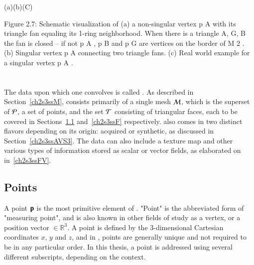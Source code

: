(a)(b)(C)

Figure 2.7: Schematic visualization of (a) a non-singular vertex p A with its triangle fan equaling its 1-ring neighborhood. When there is a triangle {A, G, B} the fan is closed – if not p A , p B and p G are vertices on the border of M 2 . (b) Singular vertex p A connecting two triangle fans. (c) Real world example for a singular vertex p A .~\cite[p.~29]{Mara12}
%
%
%
%
%
\section{\tdd}
\label{ch2s3}
The data upon which one convolves  is called \tdd{}. As described in Section~\ref{ch2s3ssM}, \tdd{} consists primarily of a single mesh $\mathcal{M}$, which is the superset of $\mathcal{P}$, a set of points, and the set $\mathcal{T}$ consisting of triangular faces, each to be covered in Sections~\ref{ch2s3ssP} and~\ref{ch2s3ssF} respectively. \tdd{} also comes in two distinct flavors depending on its origin: acquired or synthetic, as discussed in Section~\ref{ch2s3ssAVS3}. The data can also include a texture map and other various types of information stored as scalar or vector fields, as elaborated on in~\ref{ch2s3ssFV}.
%
\subsection{Points}
\label{ch2s3ssP}
A point $\mathbf{p}$ is the most primitive element of \tdd{}. "Point" is the abbreviated form of "measuring point", and is also known in other fields of study as a vertex, or a position vector $\in \mathbb{R}^3$. A point is defined by the 3-dimensional Cartesian coordinates $x$, $y$ and $z$, and in \tdd{}, points are generally unique and not required to be in any particular order. In this thesis, a point is addressed using several different subscripts, depending on the context.

